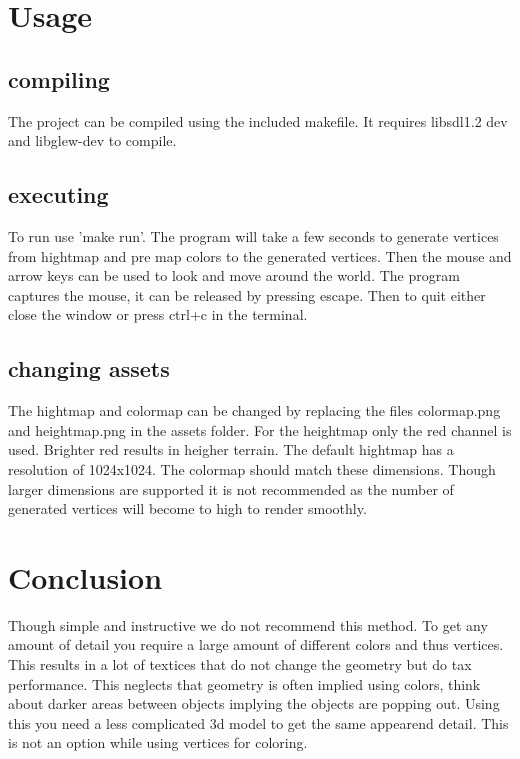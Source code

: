 \documentclass[a4paper, 11pt]{article} %
\begin{document}


\section*{Usage}

\subsection*{compiling}
The project can be compiled using the included makefile. It requires libsdl1.2 dev and libglew-dev to compile.

\subsection*{executing}
To run use 'make run'. The program will take a few seconds to generate vertices from hightmap and pre map colors to the generated vertices. Then the mouse and arrow keys can be used to look and move around the world. The program captures the mouse, it can be released by pressing escape. Then to quit either close the window or press ctrl+c in the terminal.

\subsection*{changing assets}
The hightmap and colormap can be changed by replacing the files colormap.png and heightmap.png in the assets folder. For the heightmap only the red channel is used. Brighter red results in heigher terrain. The default hightmap has a resolution of 1024x1024. The colormap should match these dimensions. Though larger dimensions are supported it is not recommended as the number of generated vertices will become to high to render smoothly.

\section*{Conclusion}

Though simple and instructive we do not recommend this method. To get any amount of detail you require a large amount of different colors and thus vertices. This results in a lot of textices that do not change the geometry but do tax performance. This neglects that geometry is often implied using colors, think about darker areas between objects implying the objects are popping out. Using this you need a less complicated 3d model to get the same appearend detail. This is not an option while using vertices for coloring.
\end{document}
